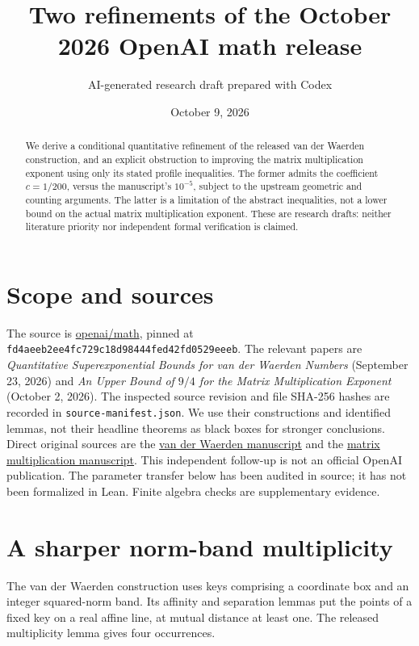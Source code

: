 \documentclass[11pt]{article}
\title{Two refinements of the October 2026 OpenAI math release}
\author{AI-generated research draft prepared with Codex}
\date{October 9, 2026}
\begin{document}
\maketitle
\begin{abstract}
We derive a conditional quantitative refinement of the released van der
Waerden construction, and an explicit obstruction to improving the matrix
multiplication exponent using only its stated profile inequalities.
The former admits the coefficient $c=1/200$, versus the manuscript's
$10^{-5}$, subject to the upstream geometric and counting arguments.
The latter is a limitation of the abstract inequalities, not a lower bound
on the actual matrix multiplication exponent. These are research drafts:
neither literature priority nor independent formal verification is claimed.
\end{abstract}

\section{Scope and sources}
The source is \href{https://github.com/openai/math}{openai/math}, pinned at
\texttt{fd4aeeb2ee4fc729c18d98444fed42fd0529eeeb}.
The relevant papers are \emph{Quantitative Superexponential Bounds for van
der Waerden Numbers} (September 23, 2026) and \emph{An Upper Bound of
$9/4$ for the Matrix Multiplication Exponent} (October 2, 2026).
The inspected source revision and file SHA-256 hashes are recorded in
\texttt{source-manifest.json}. We use their constructions and identified
lemmas, not their headline theorems as black boxes for stronger conclusions.
Direct original sources are the
\href{https://github.com/openai/math/tree/fd4aeeb2ee4fc729c18d98444fed42fd0529eeeb/preprints/Quantitative-Superexponential-Bounds-for-van-der-Waerden-Numbers-September-23-2026}{van der Waerden manuscript}
and the
\href{https://github.com/openai/math/tree/fd4aeeb2ee4fc729c18d98444fed42fd0529eeeb/preprints/Matrix-Multiplication-Nine-Fourths-October-2-2026}{matrix multiplication manuscript}.
This independent follow-up is not an official OpenAI publication.
The parameter transfer below has been audited in source; it has not been
formalized in Lean. Finite algebra checks are supplementary evidence.

\section{A sharper norm-band multiplicity}
The van der Waerden construction uses keys comprising a coordinate box
and an integer squared-norm band. Its affinity and separation lemmas put
the points of a fixed key on a real affine line, at mutual distance at
least one. The released multiplicity lemma gives four occurrences.
\end{document}
